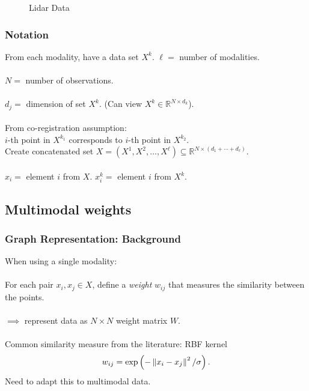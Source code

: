 \documentclass{beamer}
\begin{document}
\begin{frame}
\begin{figure}
\begin{minipage}[b]{0.40\linewidth}
      \caption{Lidar Data}
    \end{minipage}
    \hfill
  \end{figure}
\end{frame}


\begin{frame}
  \frametitle{Notation}
  From each modality, have a data set $X^k$. $\ell = $ number of modalities.\\~\\
  $N = $ number of observations.\\~\\
  $d_j = $ dimension of set $X^k$. (Can view $X^k \in \mathbb{R}^{N\times d_k}$). \\~\\
  From co-registration assumption: \\
  $i$-th point in $X^{k_1}$ corresponds to $i$-th point in $X^{k_2}$. \\
  Create concatenated set $X = (X^1,X^2,\ldots,X^\ell) \subseteq \mathbb{R}^{N\times\left(d_1+\cdots+d_\ell\right)}$. \\~\\
  $x_i = $ element $i$ from $X$. $x_i^k = $ element $i$ from $X^k$.
\end{frame}


\subsection{Multimodal weights}
\begin{frame}
  \frametitle{Graph Representation: Background}
  When using a single modality: \\~\\
  \hspace*{20pt} For each pair $x_i,x_j\in X$, define a \emph{weight} $w_{ij}$ that measures \hspace*{20pt} the similarity between the points. \\~\\
  \hspace*{20pt} $\implies$ represent data as $N \times N$ weight matrix $W$. \\~\\
  \hspace*{20pt} Common similarity measure from the literature: RBF kernel
    \[w_{ij} = \text{exp}\left(-\left\lVert x_i - x_j\right\rVert^2 / \sigma \right).\]
  Need to adapt this to multimodal data.
\end{frame}
\end{document}
